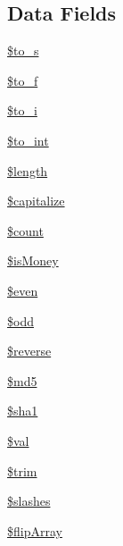 \subsection*{Data Fields}
\begin{DoxyCompactItemize}
\item 
\hyperlink{class_pierce_moore_1_1_ruby_p_h_p_1_1r_a5469620d055732b419fff71704232d2f}{\$to\-\_\-s}
\item 
\hyperlink{class_pierce_moore_1_1_ruby_p_h_p_1_1r_a85a2ada0b16d9e59f094e77df5848459}{\$to\-\_\-f}
\item 
\hyperlink{class_pierce_moore_1_1_ruby_p_h_p_1_1r_afecc47a810cf510aff6387286b9c0e73}{\$to\-\_\-i}
\item 
\hyperlink{class_pierce_moore_1_1_ruby_p_h_p_1_1r_a41eb7bfd09e3b6ad118551accfaad638}{\$to\-\_\-int}
\item 
\hyperlink{class_pierce_moore_1_1_ruby_p_h_p_1_1r_adf14d8e29912c1855022dfa252aa4087}{\$length}
\item 
\hyperlink{class_pierce_moore_1_1_ruby_p_h_p_1_1r_a41c83fecb936997f3e2dae40207e31dd}{\$capitalize}
\item 
\hyperlink{class_pierce_moore_1_1_ruby_p_h_p_1_1r_af789423037bbc89dc7c850e761177570}{\$count}
\item 
\hyperlink{class_pierce_moore_1_1_ruby_p_h_p_1_1r_aa2f5c87cc7b1ab41965e940d5c1406d9}{\$is\-Money}
\item 
\hyperlink{class_pierce_moore_1_1_ruby_p_h_p_1_1r_ab661cd196618c18d23108b83a10728f3}{\$even}
\item 
\hyperlink{class_pierce_moore_1_1_ruby_p_h_p_1_1r_aee2d4fa4e98da4e6ad23bee644ab5e7a}{\$odd}
\item 
\hyperlink{class_pierce_moore_1_1_ruby_p_h_p_1_1r_ae0d210fd358fa750a11e63b26f6d26ea}{\$reverse}
\item 
\hyperlink{class_pierce_moore_1_1_ruby_p_h_p_1_1r_a2557b214f57a046187b88572e443da1f}{\$md5}
\item 
\hyperlink{class_pierce_moore_1_1_ruby_p_h_p_1_1r_a310d84f0b735d2ab692b4e2acd90e7ef}{\$sha1}
\item 
\hyperlink{class_pierce_moore_1_1_ruby_p_h_p_1_1r_aac81a74a7b30767af29bfd9a695636df}{\$val}
\item 
\hyperlink{class_pierce_moore_1_1_ruby_p_h_p_1_1r_a0ca8b395aaa07c4aac3bdb1f9964d4f5}{\$trim}
\item 
\hyperlink{class_pierce_moore_1_1_ruby_p_h_p_1_1r_ac95fd27a35f2d9674ef3760a4ea1d07f}{\$slashes}
\item 
\hyperlink{class_pierce_moore_1_1_ruby_p_h_p_1_1r_a530c822a487ad325618509d8bf48553a}{\$flip\-Array}

\end{DoxyCompactItemize}
